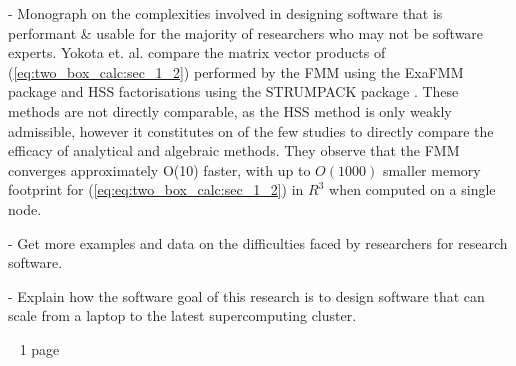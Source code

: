 - Monograph on the complexities involved in designing software that is performant \& usable for the majority of researchers who may not be software experts.
Yokota et. al. compare the matrix vector products of (\ref{eq:two_box_calc:sec_1_2}) performed by the \gls{FMM} using the ExaFMM package \cite{exafmm} and HSS factorisations using the STRUMPACK package \cite{rouet2016distributed}. These methods are not directly comparable, as the HSS method is only weakly admissible, however it constitutes on of the few studies to directly compare the efficacy of analytical and algebraic methods. They observe that the FMM converges approximately O(10) faster, with up to $O(1000)$ smaller memory footprint for (\ref{eq:eq:two_box_calc:sec_1_2}) in $R^3$ when computed on a single node.

- Get more examples and data on the difficulties faced by researchers for research software.

- Explain how the software goal of this research is to design software that can scale from a laptop to the latest supercomputing cluster.

~ 1 page
